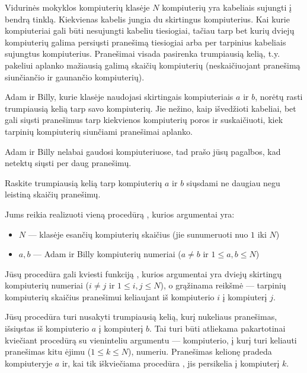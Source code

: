 \documentclass{boi2014-lt}
\begin{document}
    Vidurinės mokyklos kompiuterių klasėje $N$ kompiuterių yra kabeliais
    sujungti į bendrą tinklą. Kiekvienas kabelis jungia du skirtingus
    kompiuterius. Kai kurie kompiuteriai gali būti nesujungti kabeliu
    tiesiogiai, tačiau tarp bet kurių dviejų kompiuterių galima persiųsti
    pranešimą tiesiogiai arba per tarpinius kabeliais sujungtus kompiuterius.
    Pranešimai visada pasirenka trumpiausią kelią, t.y. pakeliui aplanko
    mažiausią galimą skaičių kompiuterių (neskaičiuojant pranešimą siunčiančio
    ir gaunančio kompiuterių).
    
    Adam ir Billy, kurie klasėje naudojasi skirtingais kompiuteriais $a$ ir $b$,
    norėtų rasti trumpiausią kelią tarp savo kompiuterių. Jie nežino, kaip
    išvedžioti kabeliai, bet gali siųsti pranešimus tarp kiekvienos
    kompiuterių poros ir suskaičiuoti, kiek tarpinių kompiuterių siunčiami
    pranešimai aplanko.
    
    Adam ir Billy nelabai gaudosi kompiuteriuose, tad prašo jūsų pagalbos, kad
    netektų siųsti per daug pranešimų.

    \Task
    Raskite trumpiausią kelią tarp kompiuterių $a$ ir $b$ siųsdami ne daugiau
    negu leistiną skaičių pranešimų.

    \Implementation
    Jums reikia realizuoti vieną procedūrą , kurios argumentai yra:

    \begin{itemize}
        \item $N$ --- klasėje esančių kompiuterių skaičius
            (jie sunumeruoti nuo $1$ iki $N$)
        \item $a, b$ --- Adam ir Billy kompiuterių numeriai
            ($a \neq b$ ir $1 \le a, b \le N$)
    \end{itemize}

    Jūsų procedūra  gali kviesti funkciją ,
    kurios argumentai yra dviejų skirtingų kompiuterių numeriai
    ($i \neq j$ ir $1 \le i, j \le N$), o grąžinama reikšmė --- tarpinių
    kompiuterių skaičius pranešimui keliaujant iš kompiuterio $i$ į
    kompiuterį $j$.

    Jūsų procedūra  turi nusakyti trumpiausią kelią, kurį
    nukeliaus pranešimas, išsiųstas iš kompiuterio $a$ į kompiuterį $b$. Tai
    turi būti atliekama pakartotinai kviečiant procedūrą  su
    vieninteliu argumentu --- kompiuterio, į kurį turi keliauti
    pranešimas kitu ėjimu ($1 \le k \le N$), numeriu. Pranešimas kelionę pradeda
    kompiuteryje $a$ ir, kai tik iškviečiama procedūra , jis
    persikelia į kompiuterį $k$.
\end{document}

